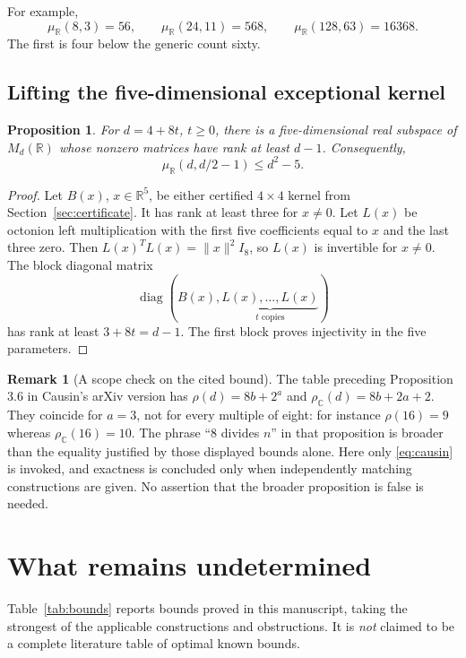 \documentclass[11pt]{article}
\newtheorem{proposition}[theorem]{Proposition}
\theoremstyle{definition}
\newtheorem{remark}[theorem]{Remark}
\newcommand{\R}{\mathbb R}
\newcommand{\C}{\mathbb C}
\newcommand{\muR}{\mu_{\R}}
\newcommand{\norm}[1]{\lVert #1\rVert}
\begin{document}
For example,
\[
 \muR(8,3)=56,\qquad \muR(24,11)=568,\qquad \muR(128,63)=16368.
\]
The first is four below the generic count sixty.

\subsection{Lifting the five-dimensional exceptional kernel}
\begin{proposition}\label{prop:lift}
For $d=4+8t$, $t\geq0$, there is a five-dimensional real subspace of $M_d(\R)$ whose nonzero matrices have rank at least $d-1$. Consequently,
\[
 \muR(d,d/2-1)\leq d^2-5.
\]
\end{proposition}
\begin{proof}
Let $B(x)$, $x\in\R^5$, be either certified $4\times4$ kernel from Section~\ref{sec:certificate}. It has rank at least three for $x\neq0$. Let $L(x)$ be octonion left multiplication with the first five coefficients equal to $x$ and the last three zero. Then $L(x)^TL(x)=\norm{x}^2I_8$, so $L(x)$ is invertible for $x\neq0$. The block diagonal matrix
\[
 \operatorname{diag}(B(x),\underbrace{L(x),\ldots,L(x)}_{t\text{ copies}})
\]
has rank at least $3+8t=d-1$. The first block proves injectivity in the five parameters.
\end{proof}

\begin{remark}[A scope check on the cited bound]
The table preceding Proposition 3.6 in Causin's arXiv version has
$\rho(d)=8b+2^a$ and $\rho_{\C}(d)=8b+2a+2$. They coincide for $a=3$, not for every multiple of eight: for instance $\rho(16)=9$ whereas $\rho_{\C}(16)=10$. The phrase ``8 divides $n$'' in that proposition is broader than the equality justified by those displayed bounds alone. Here only \eqref{eq:causin} is invoked, and exactness is concluded only when independently matching constructions are given. No assertion that the broader proposition is false is needed.
\end{remark}

\section{What remains undetermined}\label{sec:gaps}
Table~\ref{tab:bounds} reports bounds proved in this manuscript, taking the strongest of the applicable constructions and obstructions. It is \emph{not} claimed to be a complete literature table of optimal known bounds.
\end{document}
